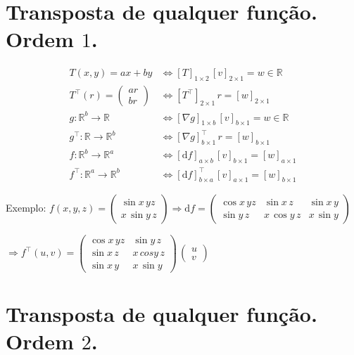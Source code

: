\documentclass[12pt]{article}
\begin{document}
\section{Transposta de qualquer fun\c{c}\~ao. Ordem $1$.}

\begin{align}
  T(x, y) = ax + by &\Leftrightarrow [T]_{1 \times 2}\, [v]_{2 \times 1} = w \in \mathbb{R} \\
  T^\top(r) = \left( \begin{matrix} ar \\ br \end{matrix} \right) &\Leftrightarrow [T^\top]_{2 \times 1}\,r = [w]_{2 \times 1} \\
  g : \mathbb{R}^b \rightarrow \mathbb{R} &\Leftrightarrow [\nabla g]_{1 \times b}\,[v]_{b \times 1} = w \in \mathbb{R} \\
  g^\top : \mathbb{R} \rightarrow \mathbb{R}^b &\Leftrightarrow [\nabla g]^\top_{b \times 1}\,r = [w]_{b \times 1} \\
  f : \mathbb{R}^b \rightarrow \mathbb{R}^a &\Leftrightarrow [\mathrm{d} f]_{a \times b}\,[v]_{b \times 1} = [w]_{a \times 1} \\
  f^\top : \mathbb{R}^a \rightarrow \mathbb{R}^b &\Leftrightarrow [\mathrm{d} f]^\top_{b \times a}\,[v]_{a \times 1} = [w]_{b \times 1}
\end{align}

	Exemplo: $f(x,y,z) = \left( \begin{matrix} \sin x\,yz \\ x\,\sin y\,z \end{matrix} \right) \Rightarrow \mathrm{d}f = \left( \begin{matrix} \cos x\,yz & \sin x\,z & \sin x\,y \\ \sin y\,z & x\, \cos y\,z & x\,\sin y \end{matrix} \right)$

	$\Rightarrow f^\top (u,v) = \left( \begin{matrix} \cos x\,yz & \sin y\,z \\ \sin x\,z & x\,cos y\,z \\ \sin x\,y & x\,\sin y \end{matrix} \right) \, \left( \begin{matrix} u \\ v \end{matrix} \right) $

\section{Transposta de qualquer fun\c{c}\~ao. Ordem $2$.}
\end{document}
